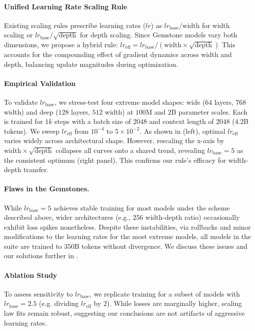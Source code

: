\documentclass{article}
\begin{document}
\paragraph{Unified Learning Rate Scaling Rule}  
Existing scaling rules prescribe learning rates (\(lr\)) as \(lr_{\text{base}}/\text{width}\) for width scaling or \(lr_{\text{base}}/\sqrt{\text{depth}}\) for depth scaling. Since Gemstone models vary both dimensions, we propose a hybrid rule: $lr_{\text{eff}} = lr_{\text{base}} / ({\text{width} \times \sqrt{\text{depth}}})$
This accounts for the compounding effect of gradient dynamics across width and depth, balancing update magnitudes during optimization.

\paragraph{Empirical Validation}  
To validate \(lr_{\text{base}}\), we stress-test four extreme model shapes: wide (\(64\) layers, \(768\) width) and deep (\(128\) layers, \(512\) width) at \(100\)M and \(2\)B parameter scales.
Each is trained for \(1k\) steps with a batch size of \(2048\) and context length of \(2048\) (\(4.2\)B tokens). 
We sweep \(lr_{\text{eff}}\) from \(10^{-4}\) to \(5\times10^{-2}\). 
As shown in  (left), optimal \(lr_{\text{eff}}\) varies widely across architectural shape.
However, rescaling the x-axis by \(\text{width} \times \sqrt{\text{depth}}\) collapses all curves onto a shared trend, revealing \(lr_{\text{base}}=5\) as the consistent optimum (right panel).
This confirms our rule's efficacy for width-depth transfer.


\paragraph{Flaws in the Gemstones.}  
While \(lr_{\text{base}}=5\) achieves stable training for most models under the scheme described above, wider architectures (e.g., \(256\) width-depth ratio) occasionally exhibit loss spikes nonetheless.
Despite these instabilities, via rollbacks and minor modifications to the learning rates for the most extreme models, all models in the suite are trained to \(350\)B tokens without divergence.
We discuss these issues and our solutions further in .

\paragraph{Ablation Study}  
To assess sensitivity to \(lr_{\text{base}}\), we replicate training for a subset of models with \(lr_{\text{base}}=2.5\) (e.g. dividing \(lr_{\text{eff}}\) by \(2\)). While losses are marginally higher, scaling law fits remain robust, suggesting our conclusions are not artifacts of aggressive learning rates.
\end{document}
